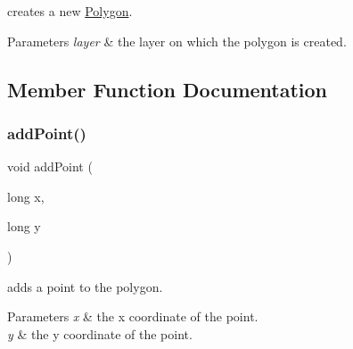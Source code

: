 creates a new \hyperlink{class_c_i_f_1_1_polygon}{Polygon}. 


\begin{DoxyParams}{Parameters}
{\em layer} & the layer on which the polygon is created. \\
\hline
\end{DoxyParams}


\subsection{Member Function Documentation}
\mbox{\label{class_c_i_f_1_1_polygon_ab3047469780327f18539907e1303ea15}} 
\subsubsection{\texorpdfstring{add\+Point()}{addPoint()}}
{\footnotesize\ttfamily void add\+Point (\begin{DoxyParamCaption}\item[{long}]{x,  }\item[{long}]{y }\end{DoxyParamCaption})}



adds a point to the polygon. 


\begin{DoxyParams}{Parameters}
{\em x} & the x coordinate of the point. \\
\hline
{\em y} & the y coordinate of the point. \\
\hline
\end{DoxyParams}
